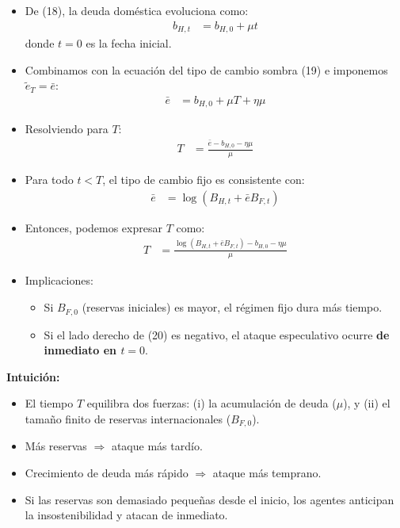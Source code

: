 \documentclass[12pt]{article}
\begin{document}
\begin{itemize}
    \item De (18), la deuda doméstica evoluciona como:
    \begin{align}
        b_{H,t} &= b_{H,0} + \mu t
    \end{align}
    donde $t=0$ es la fecha inicial.
    
    \item Combinamos con la ecuación del tipo de cambio sombra (19) e imponemos $\tilde{e}_T = \bar{e}$:
    \begin{align}
        \bar{e} &= b_{H,0} + \mu T + \eta \mu
    \end{align}
    
    \item Resolviendo para $T$:
    \begin{align}
        T &= \frac{\bar{e} - b_{H,0} - \eta \mu}{\mu}
    \end{align}
    
    \item Para todo $t < T$, el tipo de cambio fijo es consistente con:
    \begin{align}
        \bar{e} &= \log \left(B_{H,t} + \bar{e} B_{F,t}\right)
    \end{align}
    
    \item Entonces, podemos expresar $T$ como:
    \begin{align}
        T &= \frac{\log \left(B_{H,t} + \bar{e}B_{F,t}\right) - b_{H,0} - \eta \mu}{\mu} \tag{20}
    \end{align}
    
    \item Implicaciones:
    \begin{itemize}
        \item Si $B_{F,0}$ (reservas iniciales) es mayor, el régimen fijo dura más tiempo.
        \item Si el lado derecho de (20) es negativo, el ataque especulativo ocurre \textbf{de inmediato en $t=0$}.
    \end{itemize}
\end{itemize}

\noindent\textbf{Intuición:}
\begin{itemize}
    \item El tiempo $T$ equilibra dos fuerzas:  
    (i) la acumulación de deuda ($\mu$), y (ii) el tamaño finito de reservas internacionales ($B_{F,0}$).  
    \item Más reservas $\Rightarrow$ ataque más tardío.  
    \item Crecimiento de deuda más rápido $\Rightarrow$ ataque más temprano.  
    \item Si las reservas son demasiado pequeñas desde el inicio, los agentes anticipan la insostenibilidad y atacan de inmediato.
\end{itemize}
\end{document}
